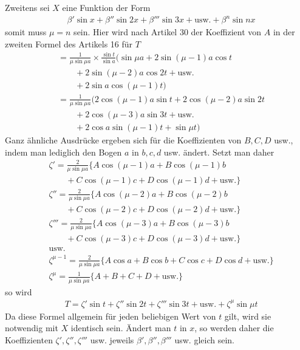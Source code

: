 \begingroup
\renewcommand{\arraystretch}{1.45}
Zweitens sei $X$ eine Funktion der Form
\[
\begin{aligned}
&\beta'\sin x+\beta''\sin2x+\beta'''\sin3x+\text{usw.}+\beta^n\sin nx
\end{aligned}
\]
somit muss $\mu=n$ sein. Hier wird nach Artikel 30 der Koeffizient von $A$ in der zweiten Formel des Artikels 16 für $T$
\[
\begin{aligned}
&=\frac{1}{\mu\sin\mu a}\times\frac{\sin t}{\sin a}(\sin\mu a+2\sin(\mu-1)a\cos t\\[5pt]
&\qquad{}+2\sin(\mu-2)a\cos2t+\text{usw.}\\[5pt]
&\qquad+2\sin a\cos(\mu-1)t)\\[5pt]
&=\frac{1}{\mu\sin\mu a}(2\cos(\mu-1)a\sin t+2\cos(\mu-2)a\sin2t\\[5pt]
&\qquad{}+2\cos(\mu-3)a\sin3t+\text{usw.}\\[5pt]
&\qquad+2\cos a\sin(\mu-1)t+\sin\mu t)
\end{aligned}
\]
Ganz ähnliche Ausdrücke ergeben sich für die Koeffizienten von $B,C,D$ usw., indem man lediglich den Bogen $a$ in $b,c,d$ usw. ändert. Setzt man daher
\[
\begin{aligned}
&\zeta'=\frac{2}{\mu\sin\mu a}\{A\cos(\mu-1)a+B\cos(\mu-1)b\\[5pt]
&\qquad{}+C\cos(\mu-1)c+D\cos(\mu-1)d+\text{usw.}\}\\[5pt]
&\zeta''=\frac{2}{\mu\sin\mu a}\{A\cos(\mu-2)a+B\cos(\mu-2)b\\[5pt]
&\qquad{}+C\cos(\mu-2)c+D\cos(\mu-2)d+\text{usw.}\}\\[5pt]
&\zeta'''=\frac{2}{\mu\sin\mu a}\{A\cos(\mu-3)a+B\cos(\mu-3)b\\[5pt]
&\qquad{}+C\cos(\mu-3)c+D\cos(\mu-3)d+\text{usw.}\}\\[5pt]
&\text{usw.}\\[5pt]
&\zeta^{\mu-1}=\frac{2}{\mu\sin\mu a}\{A\cos a+B\cos b+C\cos c+D\cos d+\text{usw.}\}\\[5pt]
&\zeta^\mu=\frac{1}{\mu\sin\mu a}\{A+B+C+D+\text{usw.}\}
\end{aligned}
\]
so wird
\[
\begin{aligned}
&T=\zeta'\sin t+\zeta''\sin2t+\zeta'''\sin3t+\text{usw.}+\zeta^\mu\sin\mu t
\end{aligned}
\]
Da diese Formel allgemein für jeden beliebigen Wert von $t$ gilt, wird sie notwendig
mit $X$ identisch sein. Ändert man $t$ in $x$, so werden daher die Koeffizienten $\zeta',\zeta'',\zeta'''$ usw. jeweils $\beta',\beta'',\beta'''$ usw. gleich sein.

